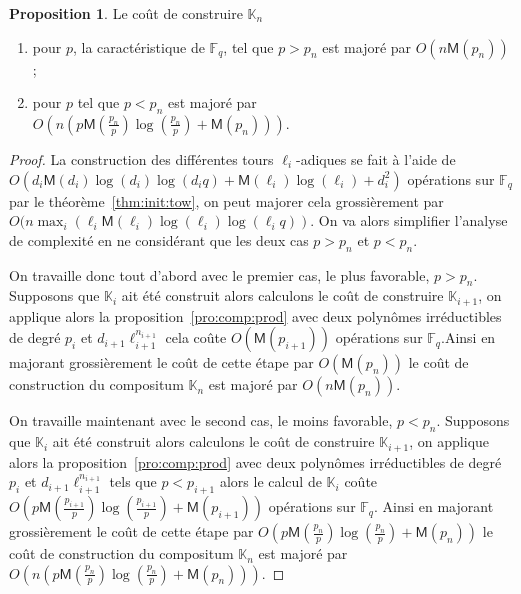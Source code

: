 \documentclass[10pt,a4paper]{book}
\theoremstyle{plain}
\theoremstyle{definition}
\theoremstyle{definition}
\theoremstyle{definition}
\newtheorem{prop}[thm]{Proposition}
\theoremstyle{definition}
\theoremstyle{remark}
\theoremstyle{remark}
\theoremstyle{definition}
\begin{document}
\begin{prop}
\label{pro:con:comp}
Le coût de construire $\mathbb{K}_n$
\begin{enumerate}
\item pour $p$, la caractéristique de $\mathbb{F}_q$, tel que $p>p_n$
est majoré par $O(n\mathsf{M}(p_n))$;
\item pour $p$ tel que $p<p_n$ est majoré par 
$O(n(p\mathsf{M}(\frac{p_n}{p})\log(\frac{p_n}{p})+\mathsf{M}(p_n)))$.
\end{enumerate}
\end{prop}

\begin{proof}
La construction des différentes tours $\ell_i$-adiques se fait à l'aide de 
$O(d_i\mathsf{M}(d_i)\log(d_i)\log(d_iq)+\mathsf{M}(\ell_i)\log(\ell_i)+d_i^2)$ 
opérations sur $\mathbb{F}_q$ par le théorème~\ref{thm:init:tow}, on peut 
majorer cela grossièrement par 
$O(n \max_i(\ell_i\mathsf{M}(\ell_i)\log(\ell_i)\log(\ell_iq))$.
On va alors simplifier l'analyse de complexité en ne considérant que les deux 
cas $p>p_n$ et $p<p_n$.

On travaille donc tout d'abord avec le premier cas, le plus favorable, $p>p_n$.
Supposons que $\mathbb{K}_i$ ait été construit alors calculons le coût de 
construire $\mathbb{K}_{i+1}$, on applique alors la 
proposition~\ref{pro:comp:prod} avec deux polynômes irréductibles de degré 
$p_i$ et $d_{i+1}\ell_{i+1}^{n_{i+1}}$ cela coûte $O(\mathsf{M}(p_{i+1}))$ 
opérations sur $\mathbb{F}_q$.Ainsi en majorant grossièrement le coût de cette 
étape par $O(\mathsf{M}(p_n))$ le coût de construction du compositum 
$\mathbb{K}_n$ est majoré par $O(n\mathsf{M}(p_n))$.

On travaille maintenant avec le second cas, le moins favorable, $p<p_n$.
Supposons que $\mathbb{K}_i$ ait été construit alors calculons le coût de 
construire $\mathbb{K}_{i+1}$, on applique alors la 
proposition~\ref{pro:comp:prod} avec deux polynômes irréductibles de degré 
$p_i$ et $d_{i+1}\ell_{i+1}^{n_{i+1}}$ tels que $p<p_{i+1}$ alors le calcul de 
$\mathbb{K}_i$ coûte 
$O(p\mathsf{M}(\frac{p_{i+1}}{p})\log(\frac{p_{i+1}}{p})+\mathsf{M}(p_{i+1}))$
opérations sur $\mathbb{F}_q$. Ainsi en majorant grossièrement le coût de cette
étape par $O(p\mathsf{M}(\frac{p_n}{p})\log(\frac{p_n}{p})+\mathsf{M}(p_n))$
le coût de construction du compositum $\mathbb{K}_n$ est majoré par 
$O(n(p\mathsf{M}(\frac{p_n}{p})\log(\frac{p_n}{p})+\mathsf{M}(p_n)))$.
\end{proof}
\end{document}
